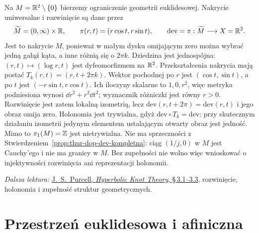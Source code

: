 \begin{przyklad}
\label{prz:klein-przebita-plaszczyzna}
Na $M=\mathbb{R}^2\setminus\{0\}$ bierzemy ograniczenie geometrii
euklidesowej. Nakrycie uniwersalne i rozwinięcie są dane przez
\[
 \widetilde M=(0,\infty)\times\mathbb{R},\qquad
 \pi(r,t)=(r\cos t,r\sin t),\qquad
 \mathrm{dev}=\pi:\widetilde M\longrightarrow X=\mathbb{R}^2.
\]
Jest to nakrycie $M$, ponieważ w małym dysku omijającym zero
można wybrać jedną gałąź kąta, a inne różnią się o $2\pi k$.
Dziedzina jest jednospójna: $(r,t)\mapsto(\log r,t)$
jest dyfeomorfizmem na $\mathbb{R}^2$.
Przekształcenia nakrycia mają postać
$T_k(r,t)=(r,t+2\pi k)$.
Wektor pochodnej po $r$ jest $(\cos t,\sin t)$,
a po $t$ jest $(-r\sin t,r\cos t)$.
Ich iloczyny skalarne to $1,0,r^2$, więc metryka
podniesiona wynosi $\dd r^2+r^2\dd t^2$;
wyznacznik różniczki jest równy $r>0$.
Rozwinięcie jest zatem lokalną izometrią, lecz
$\mathrm{dev}(r,t+2\pi)=\mathrm{dev}(r,t)$
i jego obraz omija zero.
Holonomia jest trywialna, gdyż
$\mathrm{dev}\circ T_k=\mathrm{dev}$:
przy skutecznym działaniu izometrii jedynym elementem
ustalającym otwarty obraz jest jedność.
Mimo to $\pi_1(M)=\mathbb{Z}$ jest nietrywialna.
Nie ma sprzeczności z
Stwierdzeniem~\ref{prop:thur-dop-dev-kompletna}:
ciąg $(1/j,0)$ w $M$ jest Cauchy'ego i nie ma granicy w $M$.
Bez zupełności nie wolno więc wnioskować o injektywności
rozwinięcia ani reprezentacji holonomii.
\end{przyklad}

\par\smallskip
{\footnotesize\noindent\emph{Dalsza lektura:}
\href{https://users.monash.edu/~jpurcell/book/HypKnotTheory.pdf}
{J.\ S.\ Purcell, \emph{Hyperbolic Knot Theory}, \S\,3.1--3.3},
rozwinięcie, holonomia i zupełność struktur geometrycznych.\par}

\section{Przestrzeń euklidesowa i afiniczna}
\label{sec:klein-euklidesowa-afiniczna}

